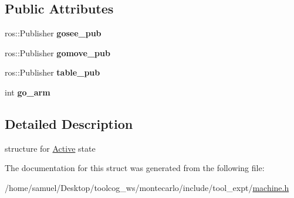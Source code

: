 \subsection*{Public Attributes}
\begin{DoxyCompactItemize}
\item 
\mbox{\label{structActive_a4bff8fbeca8d7446793b9349b759c75c}} 
ros\+::\+Publisher {\bfseries gosee\+\_\+pub}
\item 
\mbox{\label{structActive_a7ea2eba1cdaa7d6892f1d5b53cf6d972}} 
ros\+::\+Publisher {\bfseries gomove\+\_\+pub}
\item 
\mbox{\label{structActive_a9ea8f6253991811f556bdec1efe4daee}} 
ros\+::\+Publisher {\bfseries table\+\_\+pub}
\item 
\mbox{\label{structActive_a22a6505cb6c42d9a6a6dc9ab4d2d568b}} 
int {\bfseries go\+\_\+arm}
\end{DoxyCompactItemize}


\subsection{Detailed Description}
structure for \hyperlink{structActive}{Active} state 

The documentation for this struct was generated from the following file\+:\begin{DoxyCompactItemize}
\item 
/home/samuel/\+Desktop/toolcog\+\_\+ws/montecarlo/include/tool\+\_\+expt/\hyperlink{machine_8h}{machine.\+h}\end{DoxyCompactItemize}

